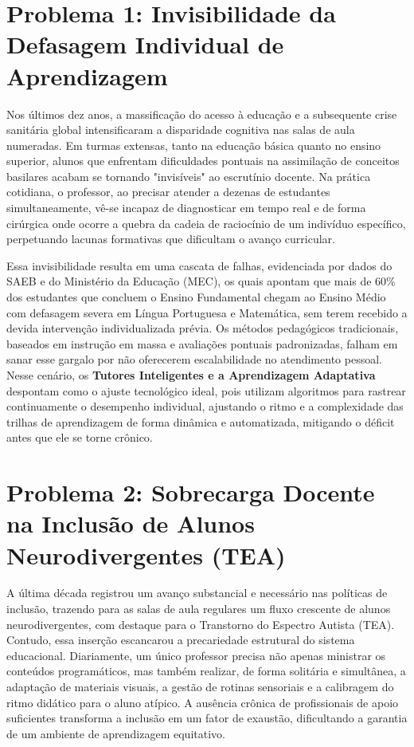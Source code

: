 \section*{Problema 1: Invisibilidade da Defasagem Individual de Aprendizagem}

Nos últimos dez anos, a massificação do acesso à educação e a subsequente crise sanitária global intensificaram a disparidade cognitiva nas salas de aula numeradas. Em turmas extensas, tanto na educação básica quanto no ensino superior, alunos que enfrentam dificuldades pontuais na assimilação de conceitos basilares acabam se tornando "invisíveis" ao escrutínio docente. Na prática cotidiana, o professor, ao precisar atender a dezenas de estudantes simultaneamente, vê-se incapaz de diagnosticar em tempo real e de forma cirúrgica onde ocorre a quebra da cadeia de raciocínio de um indivíduo específico, perpetuando lacunas formativas que dificultam o avanço curricular.

Essa invisibilidade resulta em uma cascata de falhas, evidenciada por dados do SAEB e do Ministério da Educação (MEC), os quais apontam que mais de 60\% dos estudantes que concluem o Ensino Fundamental chegam ao Ensino Médio com defasagem severa em Língua Portuguesa e Matemática, sem terem recebido a devida intervenção individualizada prévia. Os métodos pedagógicos tradicionais, baseados em instrução em massa e avaliações pontuais padronizadas, falham em sanar esse gargalo por não oferecerem escalabilidade no atendimento pessoal. Nesse cenário, os \textbf{Tutores Inteligentes e a Aprendizagem Adaptativa} despontam como o ajuste tecnológico ideal, pois utilizam algoritmos para rastrear continuamente o desempenho individual, ajustando o ritmo e a complexidade das trilhas de aprendizagem de forma dinâmica e automatizada, mitigando o déficit antes que ele se torne crônico.


\section*{Problema 2: Sobrecarga Docente na Inclusão de Alunos Neurodivergentes (TEA)}

A última década registrou um avanço substancial e necessário nas políticas de inclusão, trazendo para as salas de aula regulares um fluxo crescente de alunos neurodivergentes, com destaque para o Transtorno do Espectro Autista (TEA). Contudo, essa inserção escancarou a precariedade estrutural do sistema educacional. Diariamente, um único professor precisa não apenas ministrar os conteúdos programáticos, mas também realizar, de forma solitária e simultânea, a adaptação de materiais visuais, a gestão de rotinas sensoriais e a calibragem do ritmo didático para o aluno atípico. A ausência crônica de profissionais de apoio suficientes transforma a inclusão em um fator de exaustão, dificultando a garantia de um ambiente de aprendizagem equitativo.

